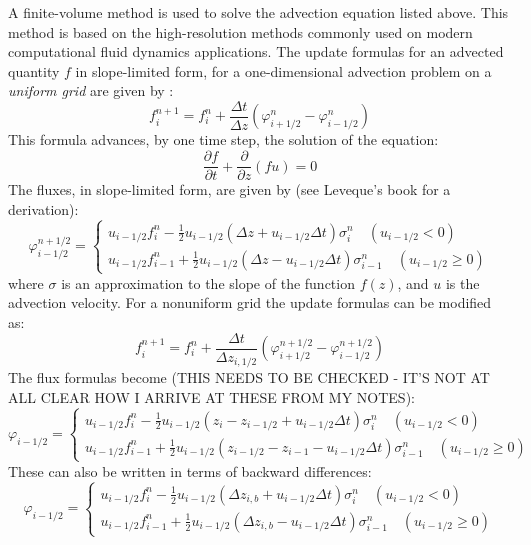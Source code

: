 \documentclass[11pt,letterpaper]{article}
\begin{document}
A finite-volume method is used to solve the advection equation listed above.  This method is based on the high-resolution methods commonly used on modern computational fluid dynamics applications.  The update formulas for an advected quantity $f$ in slope-limited form, for a one-dimensional advection problem on a \emph{uniform grid} are given by \citet[][ pg. 113]{Leveque:2002}:
\begin{equation}
f_i^{n+1} = f_i^{n} + \frac{\Delta t}{\Delta z} \left( \varphi_{i+1/2}^n - \varphi_{i-1/2}^n \right) 
\end{equation}
This formula advances, by one time step, the solution of the equation:
\begin{equation}
\frac{\partial f}{\partial t} + \frac{\partial}{\partial z} \left( f u \right) = 0
\end{equation}
The fluxes, in slope-limited form, are given by (see Leveque's book for a derivation):
\begin{equation}
\varphi_{i-1/2}^{n+1/2} = \left\{ \begin{array}{c} 
u_{i-1/2} f_{i}^n - \frac{1}{2} u_{i-1/2} \left( \Delta z + u_{i-1/2} \Delta t \right) \sigma_i^n \quad (u_{i-1/2}  < 0) \\
u_{i-1/2} f_{i-1}^n + \frac{1}{2} u_{i-1/2} \left( \Delta z - u_{i-1/2} \Delta t \right) \sigma_{i-1}^n \quad (u_{i-1/2}  \ge 0)
\end{array} \right.
\end{equation}
where $\sigma$ is an approximation to the slope of the function $f(z)$, and $u$ is the advection velocity.  For a nonuniform grid the update formulas can be modified as:
\begin{equation}
f_i^{n+1} = f_i^{n} + \frac{\Delta t}{\Delta z_{i,1/2}} \left( \varphi_{i+1/2}^{n+1/2} - \varphi_{i-1/2}^{n+1/2} \right) 
\end{equation}
The flux formulas become (THIS NEEDS TO BE CHECKED - IT'S NOT AT ALL CLEAR HOW I ARRIVE AT THESE FROM MY NOTES):
\begin{equation}
\varphi_{i-1/2} = \left\{ \begin{array}{c} 
u_{i-1/2} f_{i}^n - \frac{1}{2} u_{i-1/2} \left( z_i - z_{i-1/2} + u_{i-1/2} \Delta t \right) \sigma_i^n \quad (u_{i-1/2}  < 0) \\
u_{i-1/2} f_{i-1}^n + \frac{1}{2} u_{i-1/2} \left( z_{i-1/2} - z_{i-1} - u_{i-1/2} \Delta t \right) \sigma_{i-1}^n \quad (u_{i-1/2}  \ge 0)
\end{array} \right.
\end{equation} 
These can also be written in terms of backward differences:
\begin{equation}
\varphi_{i-1/2} = \left\{ \begin{array}{c} 
u_{i-1/2} f_{i}^n - \frac{1}{2} u_{i-1/2} \left( \Delta z_{i,b} + u_{i-1/2} \Delta t \right) \sigma_i^n \quad (u_{i-1/2}  < 0) \\
u_{i-1/2} f_{i-1}^n + \frac{1}{2} u_{i-1/2} \left( \Delta z_{i,b} - u_{i-1/2} \Delta t \right) \sigma_{i-1}^n \quad (u_{i-1/2}  \ge 0)
\end{array} \right. \label{eqn:fluxes}
\end{equation} 
\end{document}
